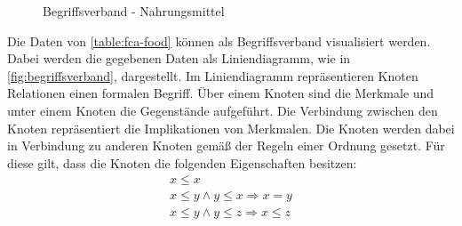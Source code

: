 \begin{figure}[!ht]
    \centering
    \caption{\label{fig:begriffsverband}Begriffsverband - Nahrungsmittel}
\end{figure}

Die Daten von \autoref{table:fca-food} können als Begriffsverband visualisiert werden.
Dabei werden die gegebenen Daten als Liniendiagramm, wie in \autoref{fig:begriffsverband}, dargestellt. %
Im Liniendiagramm repräsentieren Knoten Relationen einen formalen Begriff.
Über einem Knoten sind die Merkmale und unter einem Knoten die Gegenstände aufgeführt.
Die Verbindung zwischen den Knoten repräsentiert die Implikationen von Merkmalen.
Die Knoten werden dabei in Verbindung zu anderen Knoten gemäß der Regeln einer Ordnung gesetzt.
Für diese gilt, dass die Knoten die folgenden Eigenschaften besitzen:
\begin{align}
    x \leq x \tag{reflexiv}                                       \\
    x \leq y \land y \leq x \Rightarrow x=y \tag{antisymmetrisch} \\
    x \leq y \land y \leq z \Rightarrow x\leq z \tag{transitiv}
\end{align}

